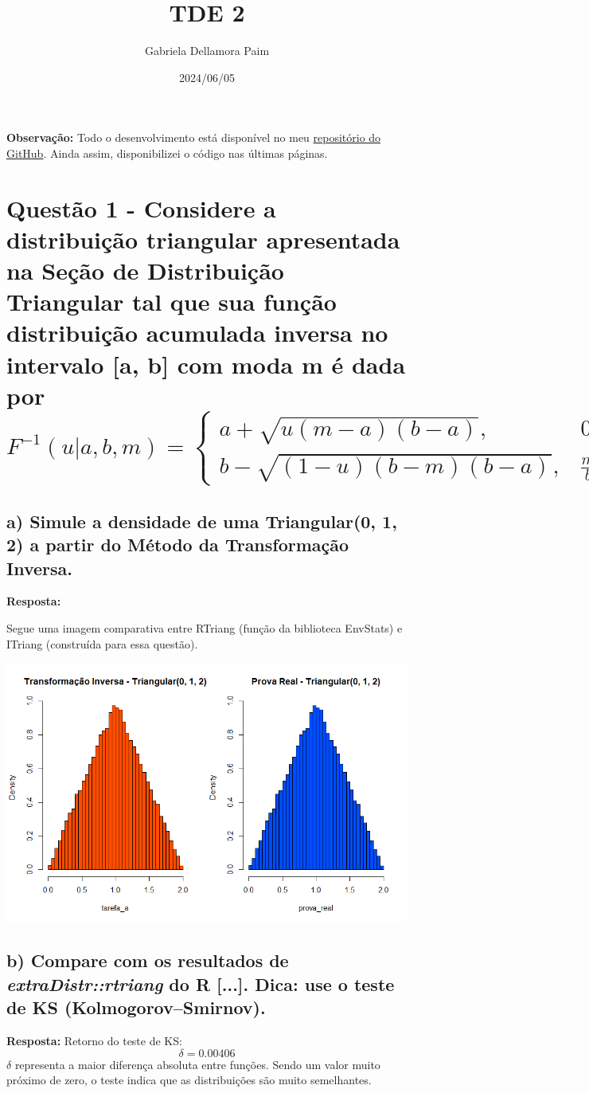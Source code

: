\documentclass{article}
\title{TDE 2}
\author{Gabriela Dellamora Paim}
\date{2024/06/05}
\begin{document}
\maketitle
\textbf{Observação:}
Todo o desenvolvimento está disponível no meu \href{https://github.com/MarnieGrenat/Inferencia-Comparada-2/blob/main/questao-1.R}{repositório do GitHub}. Ainda assim, disponibilizei o código nas últimas páginas.
\newpage
\section*{Questão 1 - Considere a distribuição triangular apresentada na Seção de Distribuição Triangular tal que sua função
distribuição acumulada inversa no intervalo [a, b] com moda m é dada por
\[
F^{-1}(u | a,b,m) = \begin{cases} 
a + \sqrt{u(m-a)(b-a)}, & 0 \leq u \leq \frac{m-a}{b-a} \\
b - \sqrt{(1 - u)(b - m)(b - a)}, & \frac{m-a}{b-a} < u \leq 1
\end{cases}
\]
}

\subsection*{a) Simule a densidade de uma Triangular(0, 1, 2) a partir do Método da Transformação Inversa.}

\textbf{Resposta:}

Segue uma imagem comparativa entre RTriang (função da biblioteca EnvStats) e ITriang (construída para essa questão).

\includegraphics[width=1\linewidth]         {image.png}

\newpage
\subsection*{b) Compare com os resultados de \textit{extraDistr::rtriang} do R [...]. Dica: use o teste de KS (Kolmogorov–Smirnov).}
\textbf{Resposta:}
Retorno do teste de KS:
\[ \delta = 0.00406 \]
$ \delta $ representa a maior diferença absoluta entre funções. Sendo um valor muito próximo de zero, o teste indica que as distribuições são muito semelhantes.
\end{document}
